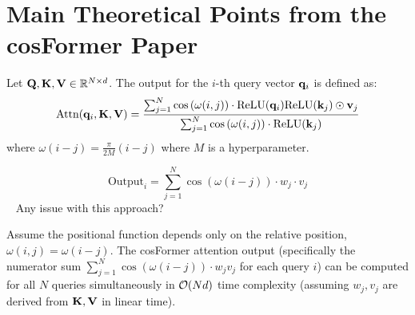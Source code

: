\documentclass[aspectratio=169]{beamer}
\begin{document}
\section*{Main Theoretical Points from the cosFormer Paper}
\begin{frame}
	\begin{definition} \label{def:cosformer_attn}

		Let $\mathbf{Q}, \mathbf{K}, \mathbf{V} \in \mathbb{R}^{N \times d}$. The output for
		the $i$-th query vector $\mathbf{q}_i$ is defined as: $$
		\text{Attn}(\mathbf{q}_i, \mathbf{K}, \mathbf{V}) = \frac{\sum_{j=1}^{N}
		\cos\left(\omega(i, j)\right) \cdot \text{ReLU}(\mathbf{q}_i) \text{ReLU}(\mathbf{k}_j)
		\odot \mathbf{v}_j}{\sum_{j=1}^{N} \cos\left(\omega(i, j)\right) \cdot
		\text{ReLU}(\mathbf{k}_j)} $$ where $\omega(i-j) = \frac{\pi}{2M}(i-j)$ where $M$
		is a hyperparameter.

	\end{definition}
	$$ \text{Output}_i = \sum_{j=1}^{N} \cos(\omega(i-j)) \cdot w_j \cdot v_j $$\
	\pause
	Any issue with this approach?
\end{frame}
\begin{frame}

	\begin{theorem} \label{thm:cosformer_linear}

		Assume the positional function depends only on the relative position,
		$\omega(i, j) = \omega(i-j)$. The cosFormer attention output (specifically
		the numerator sum $\sum_{j=1}^{N} \cos(\omega(i-j)) \cdot w_j v_j$ for each
		query $i$) can be computed for all $N$ queries simultaneously in
		$\mathcal{O}(Nd)$ time complexity (assuming $w_j, v_j$ are derived from
		$\mathbf{K}, \mathbf{V}$ in linear time).

	\end{theorem}
\end{frame}
\end{document}
